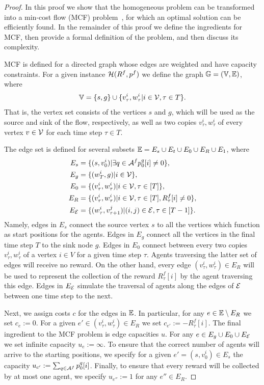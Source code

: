 \documentclass[conference]{IEEEtran}
\begin{document}
\begin{proof}
  In this proof we show that the homogeneous problem can be transformed into a min-cost flow (MCF) problem~\cite{Williamson2019}, for which an optimal solution can be efficiently found. In the remainder of this proof we define the ingredients for MCF, then provide a formal definition of the problem, and then discuss its complexity.

MCF is defined for a directed graph whose edges are weighted and have capacity constraints. For a given instance $\mathcal{H}(R^f,p^f)$ we define the graph $\mathbb{G}=(\mathbb{V},\mathbb{E})$, where
$$\mathbb{V}=\{s,g\}\cup\{v^i_\tau,w^i_\tau|i\in \mathcal{V},\tau\in T\}.$$
That is, the vertex set consists of the vertices $s$ and $g$, which will be used as the source and sink of the flow, respectively, as well as two copies $v^i_\tau,w^i_\tau$ of every vertex $v\in \mathcal{V}$ for each time step $\tau\in T$. 

The edge set is defined for several subsets $\mathbb{E}=E_{s}\cup E_t\cup E_0\cup E_{R}\cup E_1$, where
\begin{align*}
  E_s&=\{(s,v^i_0)|\exists q\in \mathcal{A}^f p^q_0[i]\neq 0\},\\
  E_g&=\{(w^i_T,g)|i\in \mathcal{V}\},\\
  E_0&=\{(v^i_\tau,w^i_\tau)|i\in \mathcal{V}, \tau\in [T]\},\\
  E_{R}&=\{(v^i_\tau,w^i_\tau)|i\in \mathcal{V}, \tau\in [T],R^f_\tau[i]\neq 0\},\\
  E_{\mathcal{E}}&=\{(w^i_\tau,v^j_{\tau+1})|(i,j)\in \mathcal{E}, \tau\in [T-1]\}.  
\end{align*}
Namely, edges in $E_s$ connect the source vertex $s$ to all the vertices which function as start positions for the agents. Edges in $E_g$ connect all the vertices in the final time step $T$ to the sink node $g$. Edges in $E_0$ connect between every two copies $v^i_\tau,w^i_\tau$ of a vertex $i\in V$ for a given time step $\tau$. Agents traversing the latter set of edges will receive no reward. On the other hand, every edge $(v^i_\tau,w^i_\tau)\in E_R$ will be used to represent the collection of the reward $R^f_\tau[i]$ by the agent traversing this edge. Edges in $E_{\mathcal{E}}$ simulate the traversal of agents along the edges of $\mathcal{E}$ between one time step to the next. 

Next, we assign costs $c$ for the edges in $\mathbb{E}$. In particular, for any $e\in \mathbb{E}\setminus E_R$ we set $c_e:=0$. For a given $e'\in(v^i_\tau,w^i_\tau)\in E_R$ we set $c_{e'}:=-R^f_\tau[i]$. The final ingredient to the MCF problem is edge capacities $u$. For any $e\in E_g\cup E_0\cup E_{\mathcal{E}}$ we set infinite capacity $u_e:=\infty$. To ensure that the correct number of agents will arrive to the starting positions, we specify for a given $e'=(s,v_0^i)\in E_s$ the capacity $u_{c'}:=\sum_{q\in \mathcal{A}^f}p_0^q[i]$. Finally, to ensure that every reward will be collected by at most one agent, we specify $u_{e''}:=1$ for any $e''\in E_R$. 


\end{proof}
\end{document}
